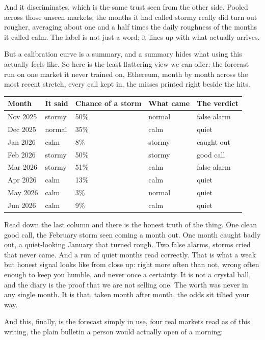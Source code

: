\documentclass[11pt]{article} %
\begin{document}
And it discriminates, which is the same trust seen from the other side. Pooled across those unseen markets, the months it had called stormy really did turn out rougher, averaging about one and a half times the daily roughness of the months it called calm. The label is not just a word; it lines up with what actually arrives.

But a calibration curve is a summary, and a summary hides what using this actually feels like. So here is the least flattering view we can offer: the forecast run on one market it never trained on, Ethereum, month by month across the most recent stretch, every call kept in, the misses printed right beside the hits.

\begin{center}
\begin{tabular}{lllll}
\hline
Month & It said & Chance of a storm & What came & The verdict \\
\hline
Nov 2025 & stormy & 50\% & normal & false alarm \\
Dec 2025 & normal & 35\% & calm & quiet \\
Jan 2026 & calm & 8\% & stormy & caught out \\
Feb 2026 & stormy & 50\% & stormy & good call \\
Mar 2026 & stormy & 51\% & calm & false alarm \\
Apr 2026 & calm & 13\% & calm & quiet \\
May 2026 & calm & 3\% & normal & quiet \\
Jun 2026 & calm & 9\% & calm & quiet \\
\hline
\end{tabular}
\end{center}


Read down the last column and there is the honest truth of the thing. One clean good call, the February storm seen coming a month out. One month caught badly out, a quiet-looking January that turned rough. Two false alarms, storms cried that never came. And a run of quiet months read correctly. That is what a weak but honest signal looks like from close up: right more often than not, wrong often enough to keep you humble, and never once a certainty. It is not a crystal ball, and the diary is the proof that we are not selling one. The worth was never in any single month. It is that, taken month after month, the odds sit tilted your way.

And this, finally, is the forecast simply in use, four real markets read as of this writing, the plain bulletin a person would actually open of a morning:
\end{document}
